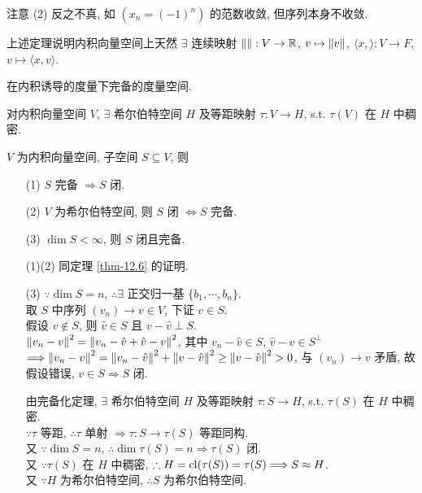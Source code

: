 \documentclass{note}
\begin{document}
注意 (2) 反之不真, 如 $(x_n=(-1)^n)$ 的范数收敛, 但序列本身不收敛.

上述定理说明内积向量空间上天然 $\exists$ 连续映射 $\left\lVert\right\rVert:V\rightarrow\mathbb{R}$, $v\mapsto\left\lVert v\right\rVert$, $\langle x,\rangle:V\rightarrow F$, $v\mapsto\langle x,v\rangle$.

\begin{df}[希尔伯特空间]
    在内积诱导的度量下完备的度量空间.
\end{df}

\begin{thm}
    对内积向量空间 $V$, $\exists$ 希尔伯特空间 $H$ 及等距映射 $\tau:V\rightarrow H$, s.t. $\tau(V)$ 在 $H$ 中稠密.
\end{thm}

\begin{thm}[(课本定理 13.7)]
    $V$ 为内积向量空间, 子空间 $S\subseteq V$, 则
    \begin{itemize}
        \item[(1)] $S$ 完备 $\Longrightarrow S$ 闭.
        \item[(2)] $V$ 为希尔伯特空间, 则 $S$ 闭 $\Longleftrightarrow S$ 完备.
        \item[(3)] $\dim S<\infty$, 则 $S$ 闭且完备.
    \end{itemize}
\end{thm}
\begin{pf}
    \begin{itemize}
        \item[(1)(2)] 同定理 \ref{thm-12.6} 的证明.
        \item[(3)] $\because\dim S=n$, $\therefore\exists$ 正交归一基 $\{b_1,\cdots,b_n\}$.\\
        取 $S$ 中序列 $(v_n)\rightarrow v\in V$, 下证 $v\in S$.\\
        假设 $v\notin S$, 则 $\hat{v}\in S$ 且 $v-\hat{v}\perp S$.\\
        $\left\lVert v_n-v\right\rVert^2=\left\lVert v_n-\hat{v}+\hat{v}-v\right\rVert^2$, 其中 $v_n-\hat{v}\in S$, $\hat{v}-v\in S^{\perp}$\\
        $\Longrightarrow\left\lVert v_n-v\right\rVert^2=\left\lVert v_n-\hat{v}\right\rVert^2+\left\lVert v-\hat{v}\right\rVert^2\geq\left\lVert v-\hat{v}\right\rVert^2>0$, 与 $(v_n)\rightarrow v$ 矛盾, 故假设错误, $v\in S\Longrightarrow S$ 闭.

        由完备化定理, $\exists$ 希尔伯特空间 $H$ 及等距映射 $\tau:S\rightarrow H$, s.t. $\tau(S)$ 在 $H$ 中稠密.\\
        $\because\tau$ 等距, $\therefore\tau$ 单射 $\Longrightarrow\tau:S\rightarrow\tau(S)$ 等距同构.\\
        又 $\because\dim S=n$, $\therefore\dim\tau(S)=n\Longrightarrow\tau(S)$ 闭.\\
        又 $\because\tau(S)$ 在 $H$ 中稠密, $\therefore H=\operatorname{cl}(\tau(S))=\tau(S)\Longrightarrow S\approx H$.\\
        又 $\because H$ 为希尔伯特空间, $\therefore S$ 为希尔伯特空间.
    \end{itemize}
\end{pf}
\end{document}
